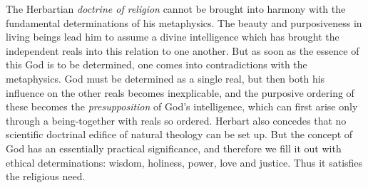\divrule

The Herbartian \emph{doctrine of religion} cannot be brought into
harmony with the fundamental determinations of his metaphysics. The
beauty and purposiveness in living beings lead him to assume a divine
intelligence which has brought the independent reals into this
relation to one another. But as soon as the essence of this God is to
be determined, one comes into contradictions with the
metaphysics. God must be determined as a single real, but then both his
influence on the other reals becomes inexplicable, and the purposive
ordering of these becomes the \emph{presupposition} of God's
intelligence, which can first arise only through a being-together with
reals so ordered. Herbart also concedes that no scientific doctrinal
edifice of natural theology can be set up. But the concept of God has
an essentially practical significance, and therefore we fill it out
with ethical determinations: wisdom, holiness, power, love and justice.
Thus it satisfies the religious need.

\divrule

